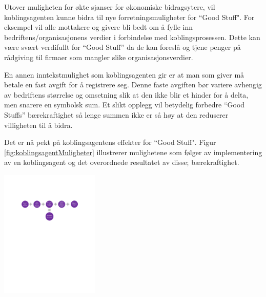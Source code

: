 Utover muligheten for økte sjanser for økonomiske bidragsytere, vil koblingsagenten kunne bidra til nye forretningsmuligheter for ``Good Stuff". For eksempel vil alle mottakere og givere bli bedt om å fylle inn bedriftens/organisasjonens verdier i forbindelse med koblingsprosessen. Dette kan være svært verdifullt for “Good Stuff” da de kan foreslå og tjene penger på rådgiving til firmaer som mangler slike organisasjonsverdier.

En annen inntekstmulighet som koblingsagenten gir er at man som giver må betale en fast avgift for å registrere seg. Denne faste avgiften bør variere avhengig av bedriftens størrelse og omsetning slik at den ikke blir et hinder for å delta, men snarere en symbolsk sum. Et slikt opplegg vil betydelig forbedre “Good Stuffs” bærekraftighet så lenge summen ikke er så høy at den reduserer villigheten til å bidra.

Det er nå pekt på koblingsagentens effekter for ``Good Stuff". Figur \ref{fig:koblingsagentMuligheter} illustrerer mulighetene som følger av implementering av en koblingsagent og det overordnede resultatet av disse; bærekraftighet.

\begin{center}
\includegraphics[clip=true, height=230, width=1 \textwidth,
trim=4cm 16cm 4cm 4cm]{koblingsagentMuligheter.pdf}
\label{fig:koblingsagentMuligheter}
\end{center}

